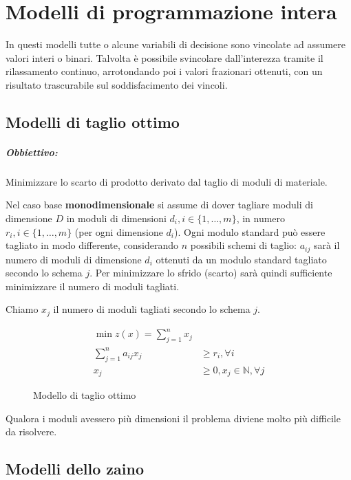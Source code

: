 \documentclass[\main/main.tex]{subfiles}
\begin{document}
\chapter{Modelli di programmazione intera}
In questi modelli tutte o alcune variabili di decisione sono vincolate ad assumere valori interi o binari. Talvolta è possibile svincolare dall'interezza tramite il rilassamento continuo, arrotondando poi i valori frazionari ottenuti, con un risultato trascurabile sul soddisfacimento dei vincoli.

\section{Modelli di taglio ottimo}
\paragraph*{Obbiettivo:} Minimizzare lo scarto di prodotto derivato dal taglio di moduli di materiale.

Nel caso base \textbf{monodimensionale} si assume di dover tagliare moduli di dimensione $D$ in moduli di dimensioni $d_i, i \in \{1,\ldots,m\}$, in numero $r_i, i \in \{1,\ldots,m\}$ (per ogni dimensione $d_i$). Ogni modulo standard può essere tagliato in modo differente, considerando $n$ possibili schemi di taglio: $a_{ij}$ sarà il numero di moduli di dimensione $d_i$ ottenuti da un modulo standard tagliato secondo lo schema $j$.
Per minimizzare lo sfrido (scarto) sarà quindi sufficiente minimizzare il numero di moduli tagliati.

Chiamo $x_j$ il numero di moduli tagliati secondo lo schema $j$.

\begin{figure}
  \begin{align*}
    \min z(x) = \sum_{j=1}^n x_j                                   \\
    \sum_{j=1}^n a_{ij}x_j & \geq r_i, \forall i                   \\
    x_j                    & \geq 0, x_j \in \mathbb{N}, \forall j
  \end{align*}
  \caption{Modello di taglio ottimo}
\end{figure}

Qualora i moduli avessero più dimensioni il problema diviene molto più difficile da risolvere.

\section{Modelli dello zaino}
\end{document}
